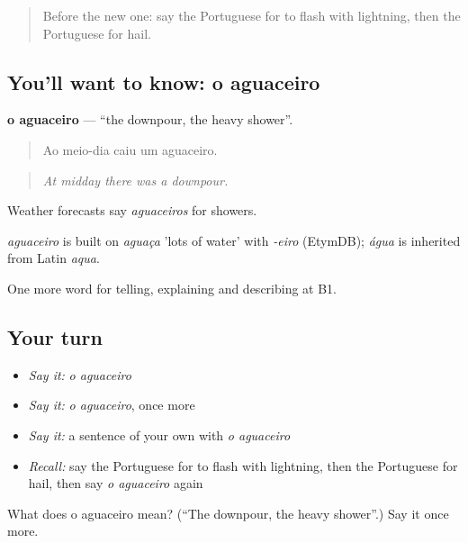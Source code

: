 \label{lesson:PT-C463-aguaceiro}



\begin{quote}
Before the new one: say the Portuguese for to flash with lightning, then the Portuguese for hail.
\end{quote}

\subsection*{You'll want to know: o aguaceiro}
\textbf{o aguaceiro} — \textquotedblleft{}the downpour, the heavy shower\textquotedblright{}.

\begin{quote}
Ao meio-dia caiu um aguaceiro.
\end{quote}

\begin{quote}
\emph{At midday there was a downpour.}
\end{quote}

Weather forecasts say \emph{aguaceiros} for showers.

\begin{cousinweb}
\emph{aguaceiro} is built on \emph{aguaça} 'lots of water' with \emph{-eiro} (EtymDB); \emph{água} is inherited from Latin \emph{aqua}.
\end{cousinweb}

\begin{grammarlens}[title={What you've built}]
One more word for telling, explaining and describing at B1.
\end{grammarlens}

\subsection*{Your turn}
\begin{itemize}
\raggedright
  \item \emph{Say it:} \emph{o aguaceiro}
  \item \emph{Say it:} \emph{o aguaceiro}, once more
  \item \emph{Say it:} a sentence of your own with \emph{o aguaceiro}
  \item \emph{Recall:} say the Portuguese for to flash with lightning, then the Portuguese for hail, then say \emph{o aguaceiro} again
\end{itemize}

\begin{tcolorbox}[breakable,colback=teal!4,colframe=teal!35!black,title={Before you move on}]
What does o aguaceiro mean? (\textquotedblleft{}The downpour, the heavy shower\textquotedblright{}.) Say it once more.
\end{tcolorbox}
